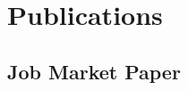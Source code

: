 \documentclass[12pt]{safecv}%
\begin{document}
\section*{Publications} %
%
\subsection*{Job Market Paper}
\end{document}
